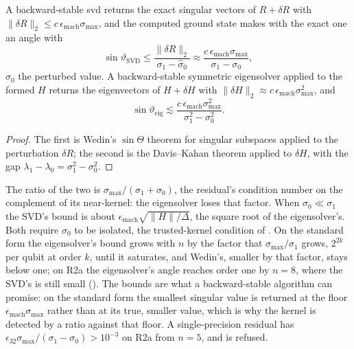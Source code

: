 \begin{proposition}
\label{prop:wedin}
A backward-stable \gls{svd} returns the exact singular vectors of $R+\delta R$ with $\|\delta R\|_2\le c\,\epsilon_{\mathrm{mach}}\sigma_{\max}$, and the computed ground state makes with the exact one an angle with
\begin{equation}
    \sin\vartheta_{\mathrm{SVD}}\le\frac{\|\delta R\|_2}{\sigma_1-\hat\sigma_0}\approx\frac{c\,\epsilon_{\mathrm{mach}}\sigma_{\max}}{\sigma_1-\sigma_0},
    \label{eq:wedin}
\end{equation}
$\hat\sigma_0$ the perturbed value. A backward-stable symmetric eigensolver applied to the formed $H$ returns the eigenvectors of $H+\delta H$ with $\|\delta H\|_2\approx c\,\epsilon_{\mathrm{mach}}\sigma_{\max}^2$, and
\begin{equation*}
    \sin\vartheta_{\mathrm{eig}}\lesssim\frac{c\,\epsilon_{\mathrm{mach}}\sigma_{\max}^2}{\sigma_1^2-\sigma_0^2}.
\end{equation*}
\end{proposition}
\begin{proof}
The first is Wedin's $\sin\Theta$ theorem for singular subspaces \cite{wedin1972perturbation} applied to the perturbation $\delta R$; the second is the Davis--Kahan theorem \cite{daviskahan1970rotation} applied to $\delta H$, with the gap $\lambda_1-\lambda_0=\sigma_1^2-\sigma_0^2$.
\end{proof}

The ratio of the two is $\sigma_{\max}/(\sigma_1+\sigma_0)$, the residual's condition number on the complement of its near-kernel: the eigensolver loses that factor. When $\sigma_0\ll\sigma_1$ the SVD's bound is about $\epsilon_{\mathrm{mach}}\sqrt{\|H\|/\Delta}$, the square root of the eigensolver's. Both require $\sigma_0$ to be isolated, the trusted-kernel condition of . On the standard form the eigensolver's bound grows with $n$ by the factor that $\sigma_{\max}/\sigma_1$ grows, $2^{2k}$ per qubit at order $k$, until it saturates, and Wedin's, smaller by that factor, stays below one; on R2a the eigensolver's angle reaches order one by $n=8$, where the SVD's is still small (). The bounds are what a backward-stable algorithm can promise: on the standard form the smallest singular value is returned at the floor $\epsilon_{\mathrm{mach}}\sigma_{\max}$ rather than at its true, smaller value, which is why the kernel is detected by a ratio against that floor. A single-precision residual has $\epsilon_{32}\sigma_{\max}/(\sigma_1-\sigma_0)>10^{-3}$ on R2a from $n=5$, and is refused.

